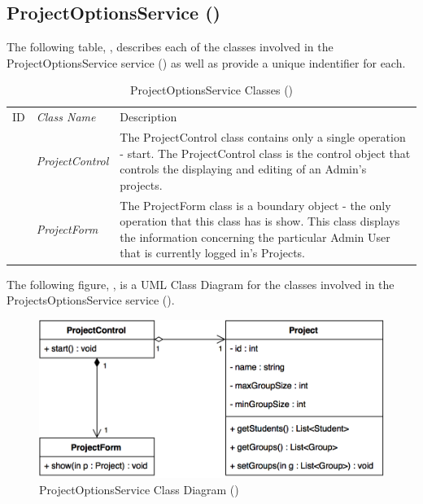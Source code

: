 \documentclass[12pt,letterpaper]{article}
\begin{document}
\subsection{ProjectOptionsService ()}

The following table, , describes each of the classes involved in the ProjectOptionsService service () as well as provide a unique indentifier for each.

\begin{table}[H]
	\caption{ProjectOptionsService Classes ()} 
	\begin{tabu} to 
	    \tableheader{}ID & Class Name & Description \\
		 & ProjectControl & The ProjectControl class contains only a single operation - start. The ProjectControl class is the control object that controls the displaying and editing of an Admin's projects.\\
		 & ProjectForm & The ProjectForm class is a boundary object - the only operation that this class has is show. This class displays the information concerning the particular Admin User that is currently logged in's Projects.\\
	\end{tabu}
\end{table}

The following figure, , is a UML Class Diagram for the classes involved in the ProjectsOptionsService service ().

\begin{figure}[H]
	\centering{}
	\includegraphics[scale=0.35]{imgs/d3/interfaces/project-options.png}
	\caption{ProjectOptionsService Class Diagram ()}
\end{figure}
\end{document}
